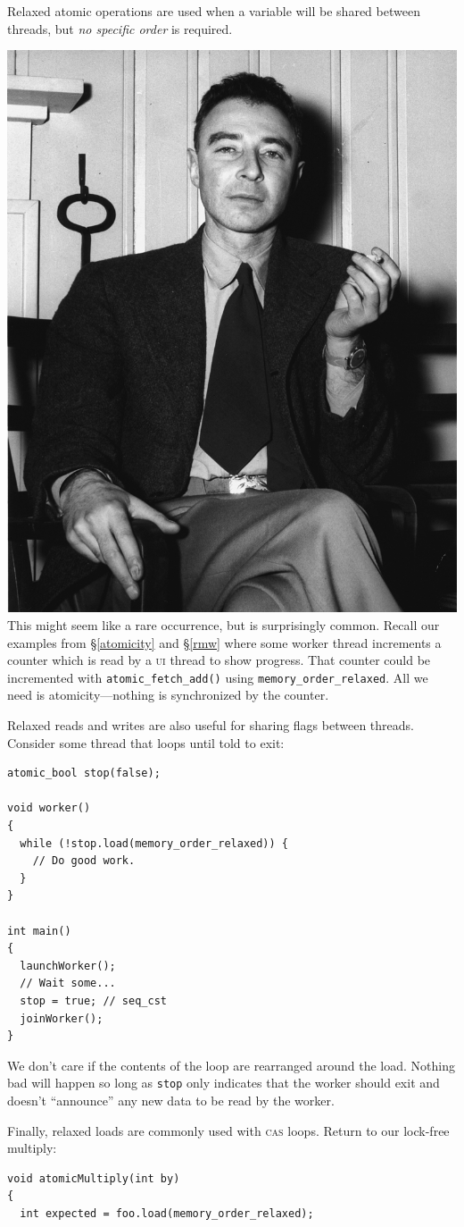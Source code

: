 \documentclass[fontsize=10pt, numbers=endperiod]{scrartcl}
\newcommand{\codesize}{\fontsize{10pt}{12pt}}
\newcommand{\secref}[1]{\hyperref[#1]{\textsc{\S}\ref*{#1}}}
\newenvironment{colfigure}
  {\par\vspace{1\baselineskip minus 0.5\baselineskip}\noindent\minipage{\linewidth}}
  {\endminipage\vspace*{1\baselineskip minus 0.7\baselineskip}}
\begin{document}
\begin{multicols}{2}
Relaxed atomic operations are used when a variable will be shared between threads,
but \emph{no specific order} is required.
\begin{colfigure}
\centering
\includegraphics[keepaspectratio,width=0.5\linewidth]{oppenheimer}
\label{oppenheimer}
\end{colfigure}
This might seem like a rare occurrence,
but is surprisingly common.
Recall our examples from \secref{atomicity} and \secref{rmw} where some worker
thread increments a counter which is read by a \textsc{ui} thread to show
progress.
That counter could be incremented with
\texttt{atomic\_fetch\_add()} using \texttt{memory\_order\_relaxed}.
All we need is atomicity---nothing is synchronized by the counter.

Relaxed reads and writes are also useful for sharing flags between threads.
Consider some thread that loops until told to exit:
\begin{colfigure}
\begin{verbatim}
atomic_bool stop(false);

void worker()
{
  while (!stop.load(memory_order_relaxed)) {
    // Do good work.
  }
}

int main()
{
  launchWorker();
  // Wait some...
  stop = true; // seq_cst
  joinWorker();
}
\end{verbatim}
\end{colfigure}
We don't care if the contents of the loop are rearranged around the load.
Nothing bad will happen so long as \texttt{stop} only indicates that the
worker should exit and doesn't ``announce'' any new data to be
read by the worker.

Finally, relaxed loads are commonly used with \textsc{cas} loops.
Return to our lock-free multiply:
\begin{colfigure}
\begin{verbatim}
void atomicMultiply(int by)
{
  int expected = foo.load(memory_order_relaxed);


\end{verbatim}
\end{colfigure}
\end{multicols}
\end{document}
